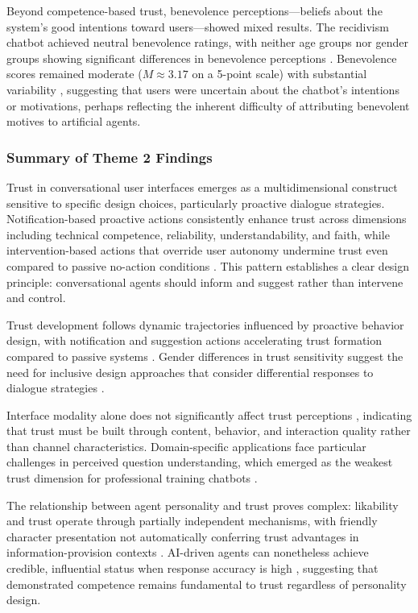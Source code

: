 \documentclass[manuscript,anonymous,sigconf]{acmart}
\begin{document}
Beyond competence-based trust, benevolence perceptions---beliefs about the system's good intentions toward users---showed mixed results. The recidivism chatbot achieved neutral benevolence ratings, with neither age groups nor gender groups showing significant differences in benevolence perceptions \cite{A54}. Benevolence scores remained moderate ($M \approx 3.17$ on a 5-point scale) with substantial variability \cite{A54}, suggesting that users were uncertain about the chatbot's intentions or motivations, perhaps reflecting the inherent difficulty of attributing benevolent motives to artificial agents.

\subsubsection{Summary of Theme 2 Findings}

Trust in conversational user interfaces emerges as a multidimensional construct sensitive to specific design choices, particularly proactive dialogue strategies. Notification-based proactive actions consistently enhance trust across dimensions including technical competence, reliability, understandability, and faith, while intervention-based actions that override user autonomy undermine trust even compared to passive no-action conditions \cite{A16}. This pattern establishes a clear design principle: conversational agents should inform and suggest rather than intervene and control.

Trust development follows dynamic trajectories influenced by proactive behavior design, with notification and suggestion actions accelerating trust formation compared to passive systems \cite{A16}. Gender differences in trust sensitivity suggest the need for inclusive design approaches that consider differential responses to dialogue strategies \cite{A16}.

Interface modality alone does not significantly affect trust perceptions \cite{A15}, indicating that trust must be built through content, behavior, and interaction quality rather than channel characteristics. Domain-specific applications face particular challenges in perceived question understanding, which emerged as the weakest trust dimension for professional training chatbots \cite{A54}.

The relationship between agent personality and trust proves complex: likability and trust operate through partially independent mechanisms, with friendly character presentation not automatically conferring trust advantages in information-provision contexts \cite{A79}. AI-driven agents can nonetheless achieve credible, influential status when response accuracy is high \cite{A81}, suggesting that demonstrated competence remains fundamental to trust regardless of personality design.
\end{document}
